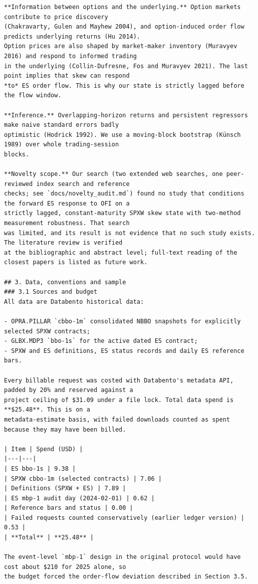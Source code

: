 \documentclass[11pt]{article}
\begin{document}
\begin{verbatim}
**Information between options and the underlying.** Option markets contribute to price discovery
(Chakravarty, Gulen and Mayhew 2004), and option-induced order flow predicts underlying returns (Hu 2014).
Option prices are also shaped by market-maker inventory (Muravyev 2016) and respond to informed trading
in the underlying (Collin-Dufresne, Fos and Muravyev 2021). The last point implies that skew can respond
*to* ES order flow. This is why our state is strictly lagged before the flow window.

**Inference.** Overlapping-horizon returns and persistent regressors make naive standard errors badly
optimistic (Hodrick 1992). We use a moving-block bootstrap (Künsch 1989) over whole trading-session
blocks.

**Novelty scope.** Our search (two extended web searches, one peer-reviewed index search and reference
checks; see `docs/novelty_audit.md`) found no study that conditions the forward ES response to OFI on a
strictly lagged, constant-maturity SPXW skew state with two-method measurement robustness. That search
was limited, and its result is not evidence that no such study exists. The literature review is verified
at the bibliographic and abstract level; full-text reading of the closest papers is listed as future work.

## 3. Data, conventions and sample
### 3.1 Sources and budget
All data are Databento historical data:

- OPRA.PILLAR `cbbo-1m` consolidated NBBO snapshots for explicitly selected SPXW contracts;
- GLBX.MDP3 `bbo-1s` for the active dated ES contract;
- SPXW and ES definitions, ES status records and daily ES reference bars.

Every billable request was costed with Databento's metadata API, padded by 20% and reserved against a
project ceiling of $31.09 under a file lock. Total data spend is **$25.48**. This is on a
metadata-estimate basis, with failed downloads counted as spent because they may have been billed.

| Item | Spend (USD) |
|---|---|
| ES bbo-1s | 9.38 |
| SPXW cbbo-1m (selected contracts) | 7.06 |
| Definitions (SPXW + ES) | 7.89 |
| ES mbp-1 audit day (2024-02-01) | 0.62 |
| Reference bars and status | 0.00 |
| Failed requests counted conservatively (earlier ledger version) | 0.53 |
| **Total** | **25.48** |

The event-level `mbp-1` design in the original protocol would have cost about $210 for 2025 alone, so
the budget forced the order-flow deviation described in Section 3.5.


\end{verbatim}
\end{document}
